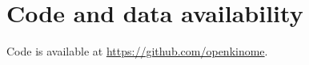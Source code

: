 \documentclass[9pt,lineno]{elife}
\begin{document}













\section{Code and data availability}
Code is available at \href{https://github.com/openkinome}{https://github.com/openkinome}.
\end{document}
